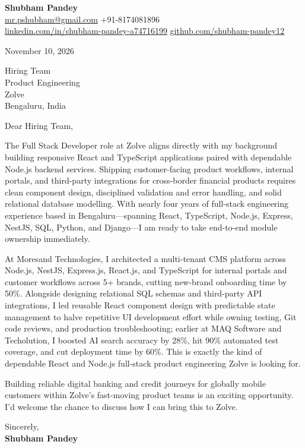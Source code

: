 \documentclass[a4paper,11pt]{article}
\begin{document}
\textbf{\Large Shubham Pandey}\\
\href{mailto:mr.pshubham@gmail.com}{mr.pshubham@gmail.com} \quad +91-8174081896\\
\href{https://www.linkedin.com/in/shubham-pandey-a74716199/}{linkedin.com/in/shubham-pandey-a74716199} \quad
\href{https://github.com/shubham-pandey12}{github.com/shubham-pandey12}

\vspace{1em}
November 10, 2026

\vspace{1em}
Hiring Team\\
Product Engineering\\
Zolve\\
Bengaluru, India

\vspace{1em}
Dear Hiring Team,

The Full Stack Developer role at Zolve aligns directly with my background building responsive React and TypeScript applications paired with dependable Node.js backend services. Shipping customer-facing product workflows, internal portals, and third-party integrations for cross-border financial products requires clean component design, disciplined validation and error handling, and solid relational database modelling. With nearly four years of full-stack engineering experience based in Bengaluru---spanning React, TypeScript, Node.js, Express, NestJS, SQL, Python, and Django---I am ready to take end-to-end module ownership immediately.

At Moresand Technologies, I architected a multi-tenant CMS platform across Node.js, NestJS, Express.js, React.js, and TypeScript for internal portals and customer workflows across 5+ brands, cutting new-brand onboarding time by 50\%. Alongside designing relational SQL schemas and third-party API integrations, I led reusable React component design with predictable state management to halve repetitive UI development effort while owning testing, Git code reviews, and production troubleshooting; earlier at MAQ Software and Techolution, I boosted AI search accuracy by 28\%, hit 90\% automated test coverage, and cut deployment time by 60\%. This is exactly the kind of dependable React and Node.js full-stack product engineering Zolve is looking for.

Building reliable digital banking and credit journeys for globally mobile customers within Zolve's fast-moving product teams is an exciting opportunity. I'd welcome the chance to discuss how I can bring this to Zolve.

\vspace{1em}
Sincerely,\\[0.5em]
\textbf{Shubham Pandey}
\end{document}
